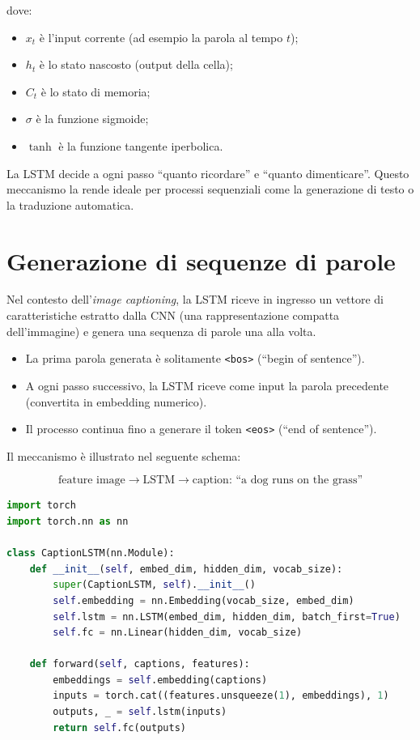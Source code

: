 \documentclass[11pt,a4paper]{report}
\newcommand{\bos}{\texttt{<bos>}}
\newcommand{\eos}{\texttt{<eos>}}
\begin{document}
dove:
\begin{itemize}
  \item $x_t$ è l’input corrente (ad esempio la parola al tempo $t$);
  \item $h_t$ è lo stato nascosto (output della cella);
  \item $C_t$ è lo stato di memoria;
  \item $\sigma$ è la funzione sigmoide;
  \item $\tanh$ è la funzione tangente iperbolica.
\end{itemize}

\begin{tcolorbox}[title=Interpretazione intuitiva]
La LSTM decide a ogni passo “quanto ricordare” e “quanto dimenticare”.  
Questo meccanismo la rende ideale per processi sequenziali come la generazione di testo o la traduzione automatica.
\end{tcolorbox}

\section{Generazione di sequenze di parole}

Nel contesto dell’\emph{image captioning}, la LSTM riceve in ingresso un vettore di caratteristiche estratto dalla CNN (una rappresentazione compatta dell’immagine) e genera una sequenza di parole una alla volta.

\begin{itemize}
  \item La prima parola generata è solitamente \bos{} (“begin of sentence”).
  \item A ogni passo successivo, la LSTM riceve come input la parola precedente (convertita in embedding numerico).
  \item Il processo continua fino a generare il token \eos{} (“end of sentence”).
\end{itemize}

Il meccanismo è illustrato nel seguente schema:

\[
\text{feature image} \rightarrow \text{LSTM} \rightarrow \text{caption: “a dog runs on the grass”}
\]

\begin{lstlisting}[language=Python, caption={Esempio semplificato di decodifica con LSTM.}]
import torch
import torch.nn as nn

class CaptionLSTM(nn.Module):
    def __init__(self, embed_dim, hidden_dim, vocab_size):
        super(CaptionLSTM, self).__init__()
        self.embedding = nn.Embedding(vocab_size, embed_dim)
        self.lstm = nn.LSTM(embed_dim, hidden_dim, batch_first=True)
        self.fc = nn.Linear(hidden_dim, vocab_size)

    def forward(self, captions, features):
        embeddings = self.embedding(captions)
        inputs = torch.cat((features.unsqueeze(1), embeddings), 1)
        outputs, _ = self.lstm(inputs)
        return self.fc(outputs)
\end{lstlisting}
\end{document}
